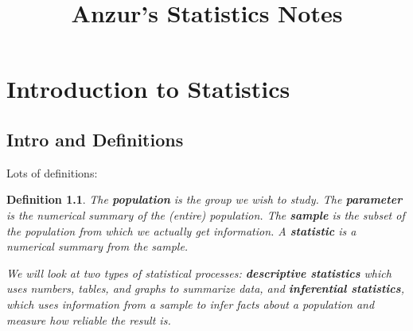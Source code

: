 \documentclass[letterpaper, 11pt, openany]{book}
\title{Anzur's Statistics Notes}
\theoremstyle{mytheoremstyle}
\newtheorem{definition}{Definition}[section]
\theoremstyle{myexamplestyle}
\begin{document}
\frontmatter


\begin{center}
    {\sffamily\huge{}\selectfont \MyTitle}
\end{center}

\pagestyle{empty}

\makeatletter
{}
\makeatother

\newpage

\mainmatter

\pagestyle{fancy}



\thispagestyle{firstofchapter}
\chapter{Introduction to Statistics}
\section{Intro and Definitions}
\setcounter{figure}{0}

Lots of definitions:
\begin{definition}\label{def:intro}
    The \textbf{population} is the group we wish to study. The \textbf{parameter} is the numerical summary of the (entire) population. The \textbf{sample} is the subset of the population from which we actually get information. A \textbf{statistic} is a numerical summary from the sample.

    We will look at two types of statistical processes: \textbf{descriptive statistics} which uses numbers, tables, and graphs to summarize data, and \textbf{inferential statistics}, which uses information from a sample to infer facts about a population and measure how reliable the result is.
\end{definition}
\end{document}
